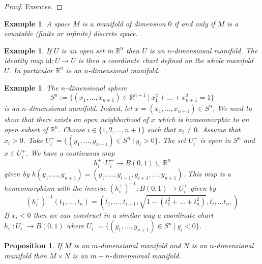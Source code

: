 \documentclass[11pt, letterpaper, oneside]{report}
\theoremstyle{pplain}
\newtheorem{proposition}[theorem]{Proposition}
\newtheorem{ITERMVALUE THM}[theorem]{Intermediate Value Theorem}
\newtheorem{HEINEBOREL THM}[theorem]{Heine-Borel Theorem}
\newtheorem{UMETR THM}[theorem]{Urysohn Metrization Theorem}
\newtheorem{UMETR2 THM}[theorem]{Urysohn Metrization Theorem (v.2)}
\theoremstyle{ddefinition}
\newtheorem{example}[theorem]{Example}
\theoremstyle{nnn}
\newtheorem{TDA NN}[theorem]{Topological Data Analysis. }
\theoremstyle{eexercise}
\newcommand{\R}{{\mathbb R}}
\newcommand{\id}{\mathrm{id}}
\begin{document}
\begin{proof}
Exercise. 
\end{proof}

\begin{example}
A space $M$ is a manifold of dimension $0$ if and only if $M$ is a countable (finite or infinite) discrete space.
\end{example}

\begin{example}
If $U$ is an open set in $\R^{n}$ then $U$ is an $n$-dimensional manifold. The identity map 
$\id \colon U \to U$ is then  a coordinate chart defined on the whole manifold $U$. In particular 
$\R^{n}$ is an $n$-dimensional manifold. 
\end{example}

\begin{example}
The $n$-dimensional sphere 
$$S^{n} := \{(x_{1}, \dots, x_{n+1})\in \R^{n+1} \ | \ x_{1}^{2}+\dots + x_{n+1}^{2} = 1 \}$$
is an $n$-dimensional manifold. 
Indeed, let $x = (x_{1}, \dots, x_{n+1}) \in S^{n}$. We need 
to show that there exists an open neighborhood of $x$ which is homeomorphic to an open subset 
of $\R^{n}$. Choose  $i\in \{1, 2, \dots, n+1\}$ such that $x_{i} \neq  0$. Assume that $x_{i} > 0$. Take 
$U_{i}^{+} = \{(y_{1}, \dots, y_{n+1})\in S^{n} \ | \ y_{i} >  0 \}$.
The set $U^{+}_{i}$ is open in $S^{n}$ and $x\in U^{+}_{i}$. We  have a continuous map 
$$h^{+}_{i}\colon U^{+}_{i} \to B(0, 1) \subseteq \R^{n}$$ 
given by $h(y_{1}, \dots, y_{n+1}) = (y_{1}, \dots, y_{i-1}, y_{i+1}, \dots, y_{n+1})$.  This map is 
a homeomorphism with the inverse $(h^{+}_{i})^{-1}\colon B(0,1) \to U^{+}_{i}$ given by 
$$(h^{+}_{i})^{-1}(t_{1}, \dots, t_{n}) = \left(t_{1}, \dots, t_{i-1}, \sqrt{1 - (t_{1}^{2} + \dots + t_{n}^{2})}, t_{i}, \dots t_{n},\right)$$
If $x_{i} <0$ then we can construct in a similar way a coordinate chart $h^{-}_{i}\colon U^{-}_{i}\to B(0, 1)$
where $U^{-}_{i} = \{(y_{1}, \dots, y_{n+1})\in S^{n} \ | \ y_{i} <  0 \}$.
\end{example}

\begin{proposition}
\label{MANIFOLDPROD PROP}
If $M$ is an $m$-dimensional manifold and $N$ is an $n$-dimensional manifold then $M\times N$
is an $m+n$-dimensional manifold. 
\end{proposition}
\end{document}
